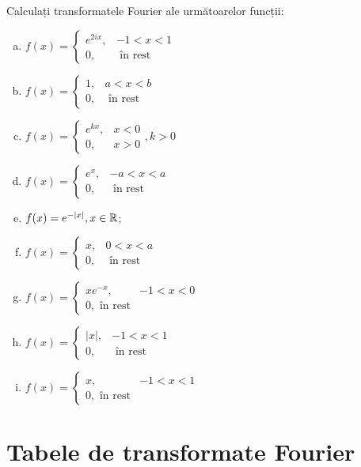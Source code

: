 Calculați transformatele Fourier ale următoarelor funcții:
\begin{enumerate}[(a)]
\item $ f(x)
  = \begin{cases}
    e^{2ix}, & -1 < x < 1 \\
    0, & \text{ în rest }
  \end{cases}
  $
\item $ f(x) =
  \begin{cases}
    1, & a < x < b \\
    0, & \text{ în rest }
  \end{cases}
  $
\item $ f(x) =
  \begin{cases}
    e^{kx}, & x < 0 \\
    0, & x > 0
  \end{cases}, k > 0
  $
\item $ f(x) =
  \begin{cases}
    e^x, & -a < x < a \\
    0, & \text{ în rest}
  \end{cases}
  $
\item $ f(x) = e^{-|x|}, x \in \mathbb{R} $;
\item $ f(x) =
  \begin{cases}
    x, & 0 < x < a \\
    0, & \text{ în rest}
  \end{cases}
  $
\item $ f(x) =
  \begin{cases}
    xe^{-x}, & -1 < x < 0 \\
    0, \text{ în rest}
  \end{cases}
  $
\item $ f(x) =
  \begin{cases}
    |x|, & -1 < x < 1 \\
    0, & \text{ în rest}
  \end{cases}
  $
\item $ f(x) =
  \begin{cases}
    x, & -1 < x < 1 \\
    0, \text{ în rest}
  \end{cases}
  $
\end{enumerate}

\newpage

\section{Tabele de transformate Fourier}

